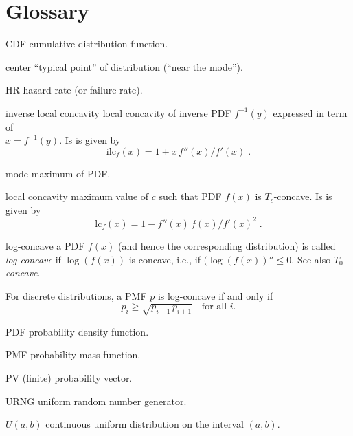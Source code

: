 
\section{Glossary}
\label{sec:glossary}

\begin{labeling}[~--~]{\hspace{5em}}
\item[CDF] 
  cumulative distribution function.

\item[center]
  ``typical point'' of distribution (``near the mode'').

\item[HR]
  hazard rate (or failure rate).

\item[inverse local concavity]
  local concavity of inverse PDF $f^{-1}(y)$ expressed in term of \\
  $x = f^{-1}(y)$. Is is given by 
  \[
  \mathrm{ilc}_f(x) = 1 + x\,f''(x) / f'(x)\;.
  \]

\item[mode]
  maximum of PDF.

\item[local concavity]
  maximum value of $c$ such that PDF $f(x)$ is $T_c$-concave.
  Is is given by
  \[
  \mathrm{lc}_f(x) = 1 - f''(x)\,f(x) / f'(x)^2\;.
  \]

\item[log-concave]
  a PDF $f(x)$ (and hence the corresponding distribution) is called 
  \emph{log-concave} if $\log(f(x))$ is concave, i.e., if
  $(\log(f(x))''\leq 0$. See also \emph{$T_0$-concave}.

  For discrete distributions, a PMF $p$ is log-concave if and only if
  \[
  p_i \geq\sqrt{p_{i-1}\,p_{i+1}}
  \quad\mbox{for all $i$.}
  \]

\item[PDF]
  probability density function.

\item[PMF]
  probability mass function.

\item[PV]
  (finite) probability vector.

\item[URNG]
  uniform random number generator.

\item[$U(a,b)$]
  continuous uniform distribution on the interval $(a,b)$.


\end{labeling}
